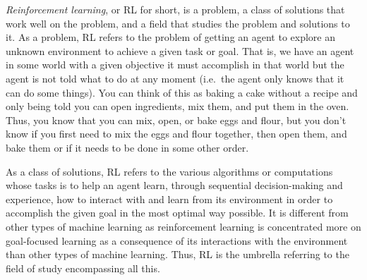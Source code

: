 

\emph{Reinforcement learning}, or RL for short, is a problem, a class of solutions that work well on the problem, and a field that studies the problem and solutions to it.
As a problem, RL refers to the problem of getting an agent to explore an unknown environment to achieve a given task or goal.
That is, we have an agent in some world with a given objective it must accomplish in that world but the agent is not told what to do at any moment (i.e.\ the agent only knows that it can do some things).
You can think of this as baking a cake without a recipe and only being told you can open ingredients, mix them, and put them in the oven.
Thus, you know that you can mix, open, or bake eggs and flour, but you don't know if you first need to mix the eggs and flour together, then open them, and bake them or if it needs to be done in some other order.

As a class of solutions, RL refers to the various algorithms or computations whose tasks is to help an agent learn, through sequential decision-making and experience, how to interact with and learn from its environment in order to accomplish the given goal in the most optimal way possible.
It is different from other types of machine learning as reinforcement learning is concentrated more on goal-focused learning as a consequence of its interactions with the environment than other types of machine learning.
Thus, RL is the umbrella referring to the field of study encompassing all this.

